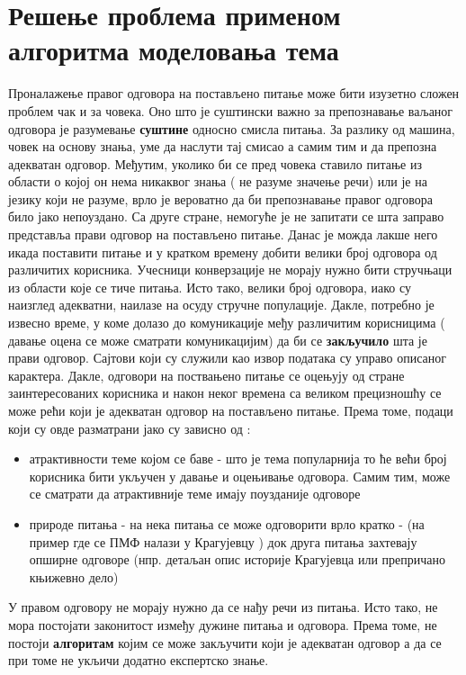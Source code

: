 \chapter{Решење проблема применом алгоритма моделовања тема }

Проналажење правог одговора на постављено питање може бити изузетно сложен проблем чак и за човека. Оно што је суштински важно за препознавање ваљаног одговора је разумевање \textbf{суштине} односно смисла питања. За разлику од машина, човек на основу знања, уме да наслути тај смисао а самим тим и да препозна адекватан одговор. Међутим, уколико би се пред човека ставило питање из области о којој он нема никаквог знања ( не разуме значење речи) или је на језику који не разуме, врло је вероватно да би препознавање правог одговора било јако непоуздано. 
Са друге стране, немогуће је не запитати се шта заправо представља прави одговор на постављено питање. Данас је можда лакше него икада поставити питање и у кратком времену добити велики број одговора од различитих корисника. Учесници конверзације не морају нужно бити стручњаци из области које се тиче питања. Исто тако, велики број одговора, иако су наизглед адекватни, наилазе на осуду стручне популације. Дакле, потребно је извесно време, у коме долазо до комуникације међу различитим корисницима ( давање оцена се може сматрати комуникацијим) да би се \textbf{закључило} шта је прави одговор. 
Сајтови који су служили као извор података су управо описаног карактера. Дакле, одговори на поствањено питање се оцењују од стране заинтересованих корисника и након неког времена са великом прецизношћу се може рећи који је адекватан одговор на постављено питање. Према томе, подаци који су овде разматрани јако су зависно од :

\begin{itemize}
\item атрактивности теме којом се баве - што је тема популарнија то ће већи број корисника бити укључен у давање и оцењивање одговора. Самим тим, може се сматрати да атрактивније теме имају поузданије одговоре
\item природе питања - на нека питања се може одговорити врло кратко - (на пример где се ПМФ налази у Крагујевцу ) док друга питања захтевају опширне одговоре (нпр. детаљан опис историје Крагујевца или препричано књижевно дело)
\end{itemize}

У правом одговору не морају нужно да се нађу речи из питања. Исто тако, не мора постојати законитост између дужине питања и одговора. Према томе, не постоји \textbf{алгоритам} којим се може закључити који је адекватан одговор а да се при томе не укљичи додатно експертско знање. 

